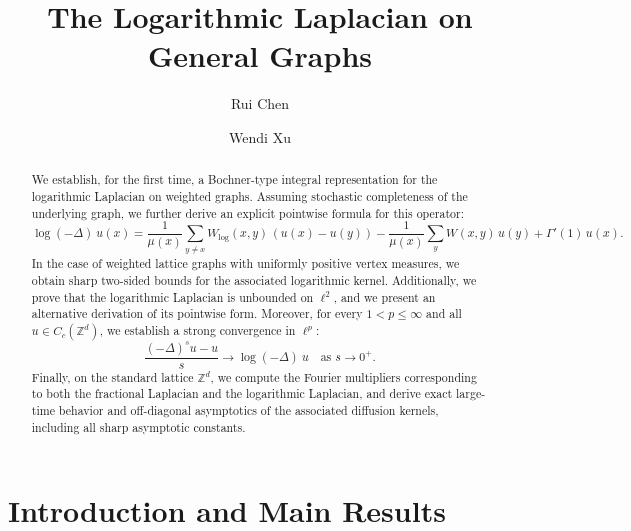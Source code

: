\documentclass[reqno,12pt]{amsart}
\numberwithin{equation}{section}
\begin{document}
	
	\title{The Logarithmic Laplacian on General Graphs}
	
	\author{Rui Chen}
	\address{School of Mathematical Sciences, Fudan University, Shanghai 200433, China}
	
	\author{Wendi Xu}
	\address{Shanghai Institute for Mathematics and Interdisciplinary Sciences, Shanghai 200433, China}
	
\begin{abstract}
	We establish, for the first time, a Bochner-type integral representation for the logarithmic Laplacian on weighted graphs. Assuming stochastic completeness of the underlying graph, we further derive an explicit pointwise formula for this operator:
{\scriptsize
	\[
	\log(-\Delta)\:u(x)
	=\frac{1}{\mu(x)}\sum_{y\neq x}W_{\log}(x,y)\,(u(x)-u(y))
	-\frac{1}{\mu(x)}\sum_{y}W(x,y)\,u(y)
	+\Gamma'(1)\,u(x).
	\]
}In the case of weighted lattice graphs with uniformly positive vertex measures, we obtain sharp two-sided bounds for the associated logarithmic kernel. Additionally, we prove that the logarithmic Laplacian is unbounded on $\ell^{2}$, and we present an alternative derivation of its pointwise form. Moreover, for every $1 < p \leq \infty$ and all $u \in C_c(\mathbb{Z}^{d})$, we establish a strong convergence in $\ell^{p}$:
	{\scriptsize\[\frac{(-\Delta)^{s} u - u}{s} \longrightarrow \log(-\Delta) \:u \quad \text{as } s \to 0^{+}.\]}Finally, on the standard lattice $\mathbb{Z}^{d}$, we compute the Fourier multipliers corresponding to both the fractional Laplacian and the logarithmic Laplacian, and derive exact large-time behavior and off-diagonal asymptotics of the associated diffusion kernels, including all sharp asymptotic constants.
\end{abstract}




\maketitle

\bigskip
{}

\setcounter{tocdepth}{2}
\tableofcontents
	
	
\section{Introduction and Main Results}
\end{document}
